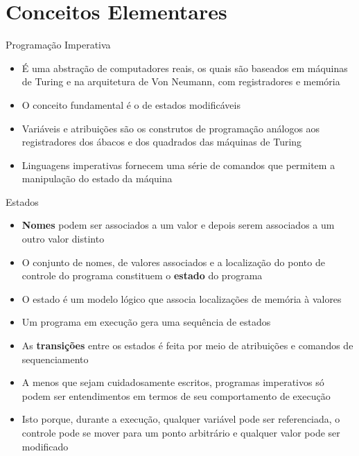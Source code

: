 \section{Conceitos Elementares}

\begin{frame}[fragile]{Programação Imperativa}

    \begin{itemize}
        \item É uma abstração de computadores reais, os quais são baseados em máquinas de Turing e 
            na arquitetura de Von Neumann, com registradores e memória

        \item O conceito fundamental é o de estados modificáveis

        \item Variáveis e atribuições são os construtos de programação análogos aos registradores 
            dos ábacos e dos quadrados das máquinas de Turing

        \item Linguagens imperativas fornecem uma série de comandos que permitem a manipulação do 
            estado da máquina
    \end{itemize}

\end{frame}

\begin{frame}[fragile]{Estados}

    \begin{itemize}
        \item \textbf{Nomes} podem ser associados a um valor e depois serem associados a 
            um outro valor distinto

        \item O conjunto de nomes, de valores associados e a localização do ponto de controle do 
            programa constituem o \textbf{estado} do programa

        \item O estado é um modelo lógico que associa localizações de memória à valores

        \item Um programa em execução gera uma sequência de estados 

        \item As \textbf{transições} entre os estados é feita por meio de atribuições e comandos 
            de sequenciamento

        \item A menos que sejam cuidadosamente escritos, programas imperativos só podem ser 
            entendimentos em termos de seu comportamento de execução

        \item Isto porque, durante a execução, qualquer variável pode ser referenciada, o 
            controle pode se mover para um ponto arbitrário e qualquer valor pode ser modificado

    \end{itemize}

\end{frame}

